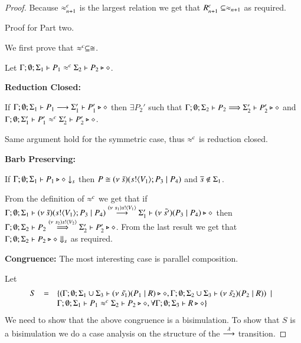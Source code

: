 \begin{proof}
	Because $\approx^{c}_{n+1}$ is the largest relation we get that $R^c_{n+1} \subseteq \approx_{n+1}$ as required.


	Proof for Part two.


	We first prove that $\approx^{c} \subseteq \cong$.

	Let $\Gamma; \emptyset; \Sigma_1 \vdash P_1 \approx^{c} \Sigma_2 \vdash P_2 \triangleright \diamond$.

	{\bf Reduction Closed:}

	If $\Gamma; \emptyset; \Sigma_1 \vdash P_1 \stackrel{}{\longrightarrow} \Sigma_1' \vdash P_1' \triangleright \diamond$ then 
	$\exists P_2'$ such that $\Gamma; \emptyset; \Sigma_2 \vdash P_2 \stackrel{}{\Longrightarrow} \Sigma_2' \vdash P_2' \triangleright \diamond$
	and $\Gamma; \emptyset; \Sigma_1' \vdash P_1' \approx^{c} \Sigma_2' \vdash P_2' \triangleright \diamond$.

	Same argument hold for the symmetric case, thus $\approx^{c}$ is reduction closed.

	{\bf Barb Preserving: }

	If $\Gamma; \emptyset; \Sigma_1 \vdash P_1 \triangleright \diamond \downarrow_{s}$ then
	$P \cong (\nu\ \tilde{s})(s ! \langle V_1 \rangle ; P_3 \;|\; P_4)$ and $\overline{s} \notin \Sigma_1$.

	From the definition of $\approx^{c}$ we get that if
	$\Gamma; \emptyset; \Sigma_1 \vdash (\nu\ \tilde{s})(s ! \langle V_1 \rangle ; P_3 \;|\; P_4) \stackrel{(\nu\ s_1) s ! \langle V_1 \rangle}{\longrightarrow} \Sigma_1' \vdash (\nu\ \tilde{s'})(P_3 \;|\; P_4) \triangleright \diamond$
	then
	$\Gamma; \emptyset; \Sigma_2 \vdash P_2 \stackrel{(\nu\ s_2) s ! \langle V_2 \rangle}{\Longrightarrow} \Sigma_2' \vdash P_2' \triangleright \diamond$.
	From the last result we get that
	$\Gamma; \emptyset; \Sigma_2 \vdash P_2 \triangleright \diamond \Downarrow_{s}$ as required.


	{\bf Congruence: }
	The most interesting case is parallel composition.

	Let
	\[
	\begin{array}{rcl}
		S &=&	\{(\Gamma; \emptyset; \Sigma_1 \cup \Sigma_3 \vdash (\nu\ \tilde{s_1})(P_1 \;|\; R) \triangleright \diamond, \Gamma; \emptyset; \Sigma_2 \cup \Sigma_3 \vdash (\nu\ \tilde{s_2})(P_2 \;|\; R)) \ \ |\ \  \\
		& &	\Gamma;\emptyset;\Sigma_1 \vdash P_1 \approx^{c} \Sigma_2 \vdash P_2 \triangleright \diamond, \forall \Gamma; \emptyset; \Sigma_3 \vdash R \triangleright \diamond\}
	\end{array}
	\]
	We need to show that the above congruence is a bisimulation.
	To show that $S$ is a bisimulation we do a case analysis on the structure
	of the $\stackrel{\lambda}{\longrightarrow}$ transition.


\end{proof}
